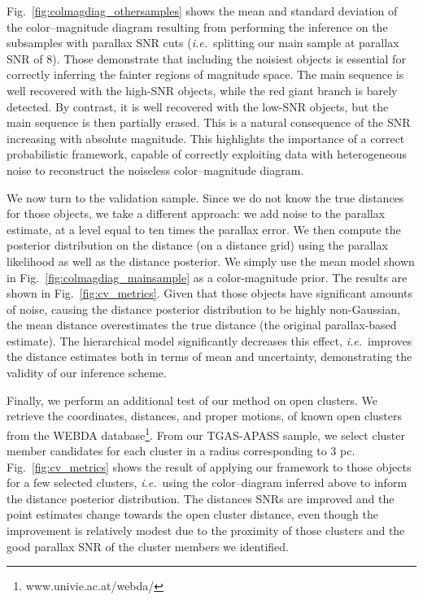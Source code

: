 \documentclass[manuscript, letterpaper]{aastex6}
\newcommand{\ie}{{\textit{i.e.}~}}
\newcommand{\figref}[1]{{\xspace}Fig.~\ref{#1}}
\begin{document}
\figref{fig:colmagdiag_othersamples} shows the  mean and standard deviation of the color--magnitude diagram resulting from performing the inference on the subsamples with parallax SNR cuts (\ie splitting our main sample at parallax SNR of 8). 
Those demonstrate that including the noisiest objects is essential for correctly inferring the fainter regions of magnitude space.
The main sequence is well recovered with the high-SNR objects, while the red giant branch is barely detected. 
By contrast, it is well recovered with the low-SNR objects, but the main sequence is then partially erased.
This is a natural consequence of the SNR increasing with absolute magnitude.
This highlights the importance of a correct probabilistic framework, capable of correctly exploiting data with heterogeneous noise to reconstruct the noiseless color--magnitude diagram.

We now turn to the validation sample. 
Since we do not know the true distances for those objects, we take a different approach: we add noise to the parallax estimate, at a level equal to ten times the parallax error. 
We then compute the posterior distribution on the distance (on a distance grid) using the parallax likelihood as well as the distance posterior. We simply use the mean model shown in \figref{fig:colmagdiag_mainsample} as a color-magnitude prior. 
The results are shown in \figref{fig:cv_metrics}.
Given that those objects have significant amounts of noise, causing the distance posterior distribution to be highly non-Gaussian, the mean distance overestimates the true distance (the original parallax-based estimate). 
The hierarchical model significantly decreases this effect, \ie improves the distance estimates both in terms of mean and uncertainty, demonstrating the validity of our inference scheme.

Finally, we perform an additional test of our method on open clusters.
We retrieve the coordinates, distances, and proper motions, of known open clusters from the WEBDA database\footnote{www.univie.ac.at/webda/}.
From our TGAS-APASS sample, we select cluster member candidates for each cluster in a radius corresponding to 3 pc.
\figref{fig:cv_metrics} shows the result of applying our framework to those objects for a few selected clusters, \ie using the color--diagram inferred above to inform the distance posterior distribution.
The distances SNRs are improved and the point estimates change towards the open cluster distance, even though the improvement is relatively modest due to the proximity of those clusters and the good parallax SNR of the cluster members we identified.
\end{document}
